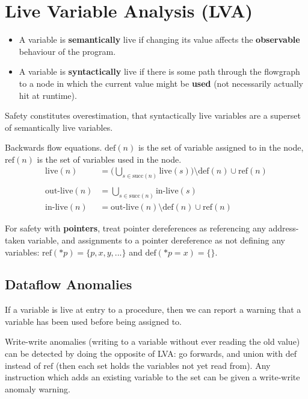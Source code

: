 \documentclass[a4paper, 11pt]{article}
\begin{document}
\section*{Live Variable Analysis (LVA)}
{
    \begin{itemize}
    \item A variable is \textbf{semantically} live if changing its value affects the \textbf{observable} behaviour of the program.
    \item A variable is \textbf{syntactically} live if there is some path through the flowgraph to a node in which the current value might be \textbf{used} (not necessarily actually hit at runtime).
    \end{itemize}

    Safety constitutes overestimation, that syntactically live variables are a superset of semantically live variables.

    Backwards flow equations. \(\text{def}(n)\) is the set of variable assigned to in the node, \(\text{ref}(n)\) is the set of variables used in the node.
    \begin{align*}
    \text{live}(n) &= \bigg(\bigcup_{s \in \text{succ}(n)}{\text{live}(s)}\bigg) \setminus \text{def}(n) \cup \text{ref}(n) \\\\
    \text{out-live}(n) &= \bigcup_{s \in \text{succ}(n)}{\text{in-live}(s)} \\
    \text{in-live}(n) &= \text{out-live}(n) \setminus \text{def}(n) \cup \text{ref}(n)
    \end{align*}

    For safety with \textbf{pointers}, treat pointer dereferences as referencing any address-taken variable, and assignments to a pointer dereference as not defining any variables: \(\text{ref}(*p) = \{p, x, y, ...\}\) and \(\text{def}(*p = x) = \{\}\).

    \subsection*{Dataflow Anomalies}
    {
        If a variable is live at entry to a procedure, then we can report a warning that a variable has been used before being assigned to.

        Write-write anomalies (writing to a variable without ever reading the old value) can be detected by doing the opposite of LVA: go forwards, and union with \(\text{def}\) instead of \(\text{ref}\) (then each set holds the variables not yet read from). Any instruction which adds an existing variable to the set can be given a write-write anomaly warning.
    }
}
\end{document}
